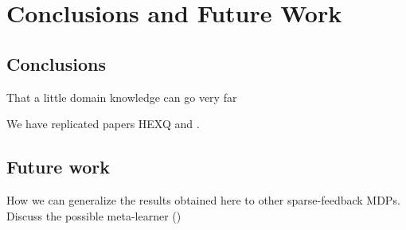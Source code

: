 \chapter{Conclusions and Future Work}
  \section{Conclusions}
  That a little domain knowledge can go very far

  We have replicated papers HEXQ and \citet{kulkarni2016hierarchical}.

  
  \section{Future work}
  How we can generalize the results obtained here to other sparse-feedback MDPs.
  Discuss the possible meta-learner (\cite[Section~9.2]{sutton1998introduction})

